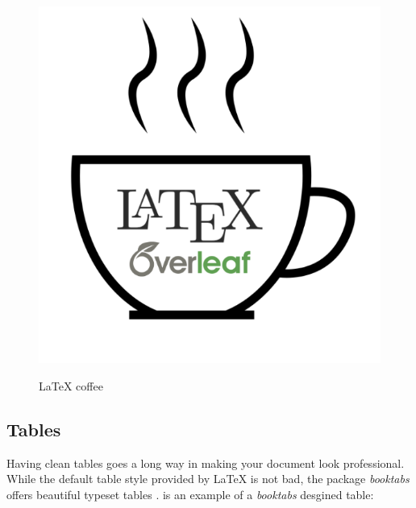 \documentclass{article} %
\begin{document}
\begin{figure}[H]
    \includegraphics[scale=0.3]{latexcoffee.png}
        \label{fig:latexcoffee}
        \caption{\LaTeX{} coffee}
\end{figure}


\subsection{Tables}
Having clean tables goes a long way in making your document look professional. While the default table style provided by \LaTeX{} is not bad, the package \textit{booktabs} offers beautiful typeset tables \citep{fear2005publication}.  is an example of a \textit{booktabs} desgined table:
\end{document}
